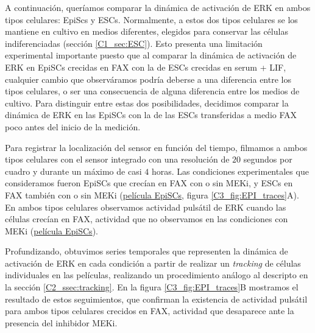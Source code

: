 \documentclass[./main.tex]{subfiles}
\begin{document}
A continuación, queríamos comparar la dinámica de activación de ERK en ambos tipos celulares: EpiScs y ESCs. Normalmente, a estos dos tipos celulares se los mantiene en cultivo en medios diferentes, elegidos para conservar las células indiferenciadas (sección \ref{C1_sec:ESC}). Esto presenta una limitación experimental importante puesto que al comparar la dinámica de activación de ERK en EpiSCs crecidas en FAX con la de ESCs crecidas en serum + LIF, cualquier cambio que observáramos podría deberse a una diferencia entre los tipos celulares, o ser una consecuencia de alguna diferencia entre los medios de cultivo. Para distinguir entre estas dos posibilidades, decidimos comparar la dinámica de ERK en las EpiSCs con la de las ESCs transferidas a medio FAX poco antes del inicio de la medición.


Para registrar la localización del sensor en función del tiempo, filmamos a ambos tipos celulares con el sensor integrado con una resolución de $20$ segundos por cuadro y durante un máximo de casi $4$ horas. Las condiciones experimentales que consideramos fueron EpiSCs que crecían en FAX con o sin MEKi, y ESCs en FAX también con o sin MEKi (\href{http://movie.biologists.com/video/10.1242/dev.199710/video-3}{película EpiSCs}, figura \ref{C3_fig:EPI_traces}A). En ambos tipos celulares observamos actividad pulsátil de ERK cuando las células crecían en FAX, actividad que no observamos en las condiciones con MEKi (\href{http://movie.biologists.com/video/10.1242/dev.199710/video-3}{película EpiSCs}).


Profundizando, obtuvimos series temporales que representen la dinámica de activación de ERK en cada condición a partir de realizar un \textit{tracking} de células individuales en las películas, realizando un procedimiento análogo al descripto en la sección \ref{C2_ssec:tracking}. En la figura \ref{C3_fig:EPI_traces}B mostramos el resultado de estos seguimientos, que confirman la existencia de actividad pulsátil para ambos tipos celulares crecidos en FAX, actividad que desaparece ante la presencia del inhibidor MEKi. 
\end{document}
